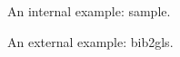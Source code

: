 \documentclass{article}
\begin{document}
An internal example: \gls{sample}.

An external example: \gls{bib2gls}.

\printglossaries
\end{document}
